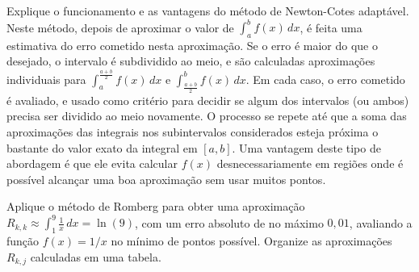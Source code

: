 \documentclass[12pt,a4paper]{article}
\begin{document}
\begin{ExerciseList}
\Exercise[title={1,0}]
Explique o funcionamento e as vantagens do método de Newton-Cotes adaptável.
\Answer Neste método, depois de aproximar o valor de $\int_a^b f(x)\,dx$, é feita uma estimativa do erro cometido nesta aproximação. Se o erro é maior do que o desejado, o intervalo é subdividido ao meio, e são calculadas aproximações individuais para $\int_a^{\frac{a+b}{2}} f(x)\,dx$ e $\int_{\frac{a+b}{2}}^b f(x)\,dx$. Em cada caso, o erro cometido é avaliado, e usado como critério para decidir se algum dos intervalos (ou ambos) precisa ser dividido ao meio novamente. O processo se repete até que a soma das aproximações das integrais nos subintervalos considerados esteja próxima o bastante do valor exato da integral em $[a,b]$. Uma vantagem deste tipo de abordagem é que ele evita calcular $f(x)$ desnecessariamente em regiões onde é possível alcançar uma boa aproximação sem usar muitos pontos.

\Exercise[title={3,0}] Aplique o método de Romberg para obter uma aproximação $\displaystyle R_{k,k} \approx \int_{1}^{9} \frac{1}{x}\, dx = \ln(9)$, com um erro absoluto de no máximo $0,01$, avaliando a função $f(x) = 1/x$ no mínimo de pontos possível. Organize as aproximações $R_{k,j}$ calculadas em uma tabela.


\end{ExerciseList}
\end{document}
